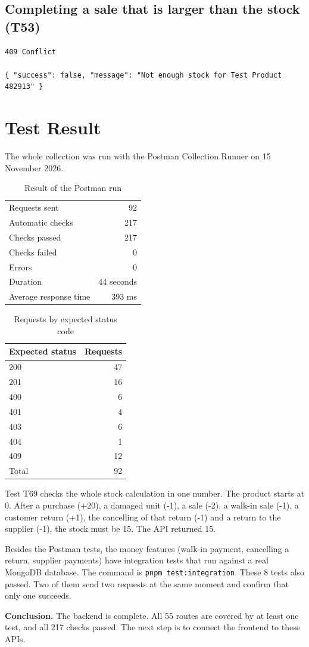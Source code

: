 \documentclass[11pt,a4paper]{article}
\newcommand{\code}[1]{\texttt{#1}}
\begin{document}
\subsection*{Completing a sale that is larger than the stock (T53)}
\begin{lstlisting}[style=result]
409 Conflict

{ "success": false, "message": "Not enough stock for Test Product 482913" }
\end{lstlisting}

\section{Test Result}
The whole collection was run with the Postman Collection Runner on 15 November 2026.

\begin{table}[h]
\centering
\begin{tabular}{@{}lr@{}}
\toprule
Requests sent & 92 \\
Automatic checks & 217 \\
Checks passed & 217 \\
Checks failed & 0 \\
Errors & 0 \\
Duration & 44 seconds \\
Average response time & 393 ms \\
\bottomrule
\end{tabular}
\caption{Result of the Postman run}
\end{table}

\begin{table}[h]
\centering
\begin{tabular}{@{}lr@{}}
\toprule
\textbf{Expected status} & \textbf{Requests} \\
\midrule
200 & 47 \\
201 & 16 \\
400 & 6 \\
401 & 4 \\
403 & 6 \\
404 & 1 \\
409 & 12 \\
\midrule
Total & 92 \\
\bottomrule
\end{tabular}
\caption{Requests by expected status code}
\end{table}

Test T69 checks the whole stock calculation in one number. The product starts at 0. After a purchase (+20), a damaged unit (-1), a sale (-2), a walk-in sale (-1), a customer return (+1), the cancelling of that return (-1) and a return to the supplier (-1), the stock must be 15. The API returned 15.

Besides the Postman tests, the money features (walk-in payment, cancelling a return, supplier payments) have integration tests that run against a real MongoDB database. The command is \code{pnpm test:integration}. These 8 tests also passed. Two of them send two requests at the same moment and confirm that only one succeeds.

\textbf{Conclusion.} The backend is complete. All 55 routes are covered by at least one test, and all 217 checks passed. The next step is to connect the frontend to these APIs.
\end{document}
